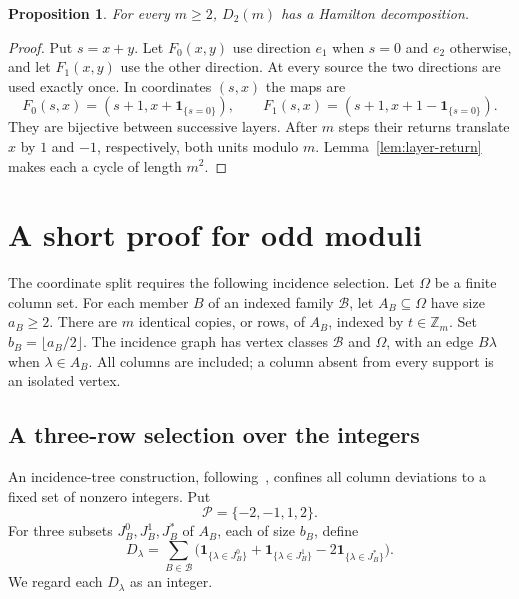 \documentclass[11pt,reqno]{amsart}
\numberwithin{equation}{section}
\newtheorem{proposition}[theorem]{Proposition}
\theoremstyle{definition}
\theoremstyle{remark}
\newcommand{\Zm}{\mathbb Z_m}
\newcommand{\one}{\mathbf 1}
\newcommand{\cB}{\mathcal B}
\newcommand{\cO}{\Omega}
\begin{document}
\begin{proposition}\label{prop:square}
For every $m\ge2$, $D_2(m)$ has a Hamilton decomposition.
\end{proposition}
\begin{proof}
Put $s=x+y$. Let $F_0(x,y)$ use direction $e_1$ when $s=0$ and $e_2$
otherwise, and let $F_1(x,y)$ use the other direction.
At every source the two directions are used exactly once.
In coordinates $(s,x)$ the maps are
\[
 F_0(s,x)=(s+1,x+\one_{\{s=0\}}),\qquad
 F_1(s,x)=(s+1,x+1-\one_{\{s=0\}}).
\]
They are bijective between successive layers. After $m$ steps their
returns translate $x$ by $1$ and $-1$, respectively, both units modulo
$m$. Lemma~\ref{lem:layer-return} makes each a cycle of length $m^2$.
\end{proof}

\section{A short proof for odd moduli}\label{sec:odd}\label{sec:selection}
The coordinate split requires the following incidence selection.
Let $\cO$ be a finite column set. For each member $B$ of an indexed family
$\cB$, let $A_B\subseteq\cO$ have size $a_B\ge2$. There are $m$ identical copies,
or rows, of $A_B$, indexed by $t\in\Zm$. Set $b_B=\lfloor a_B/2\rfloor$.
The incidence graph has vertex classes $\cB$ and $\cO$, with an edge $B\lambda$
when $\lambda\in A_B$. All columns are included; a column absent from every
support is an isolated vertex.

\subsection{A three-row selection over the integers}
An incidence-tree construction, following~\cite{ParkShort}, confines
all column deviations to a fixed set of nonzero integers. Put
\[
 \mathcal P=\{-2,-1,1,2\}.
\]
For three subsets $J_B^0,J_B^1,J_B^*$ of $A_B$, each of size $b_B$, define
\begin{equation}\label{eq:integer-charge}
 D_\lambda=\sum_{B\in\cB}
 \bigl(\one_{\{\lambda\in J_B^0\}}+
       \one_{\{\lambda\in J_B^1\}}-2\one_{\{\lambda\in J_B^*\}}\bigr).
\end{equation}
We regard each $D_\lambda$ as an integer.
\end{document}
